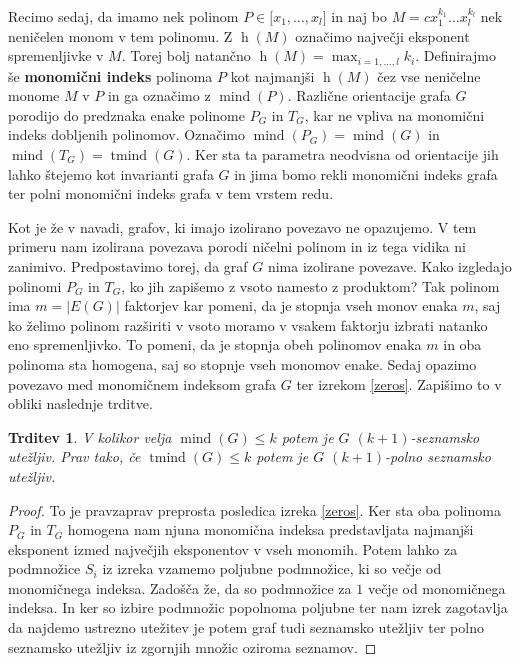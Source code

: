 \documentclass[12pt,a4paper,twoside]{article}
\theoremstyle{definition} %
\theoremstyle{plain} %
\newtheorem{trditev}[definicija]{Trditev}
\numberwithin{equation}{section}  %
\DeclareMathOperator{\mind}{mind}
\DeclareMathOperator{\tmind}{tmind}
\DeclareMathOperator{\h}{h}
\begin{document}
Recimo sedaj, da imamo nek polinom $ P \in \mathbb[x_1, \ldots, x_l]$ in naj bo $M = cx_1^{k_1} \ldots x_l^{k_l}$ nek neničelen monom v tem polinomu. Z $\h(M)$ označimo največji eksponent spremenljivke v $M$. Torej bolj natančno $\h(M) = \max_{i = 1, \ldots, l} k_i$. Definirajmo še \textbf{monomični indeks} polinoma $P$ kot najmanjši $\h(M)$ čez vse neničelne monome $M$ v $P$ in ga označimo z \textbf{$\mind(P)$}. Različne orientacije grafa $G$ porodijo do predznaka enake polinome $P_G$ in $T_G$, kar ne vpliva na monomični indeks dobljenih polinomov. Označimo $\mind(P_G) = \mind(G)$ in $\mind(T_G) = \tmind(G)$. Ker sta ta parametra neodvisna od orientacije jih lahko štejemo kot invarianti grafa $G$ in jima bomo rekli monomični indeks grafa ter polni monomični indeks grafa v tem vrstem redu. 

Kot je že v navadi, grafov, ki imajo izolirano povezavo ne opazujemo. V tem primeru nam izolirana povezava porodi ničelni polinom in iz tega vidika ni zanimivo. Predpostavimo torej, da graf $G$ nima izolirane povezave. Kako izgledajo polinomi $P_G$ in $T_G$, ko jih zapišemo z vsoto namesto z produktom? Tak polinom ima $m = |E(G)|$ faktorjev kar pomeni, da je stopnja vseh monov enaka $m$, saj ko želimo polinom razširiti v vsoto moramo v vsakem faktorju izbrati natanko eno spremenljivko. To pomeni, da je stopnja obeh polinomov enaka $m$ in oba polinoma sta homogena, saj so stopnje vseh monomov enake. Sedaj opazimo povezavo med monomičnem indeksom grafa $G$ ter izrekom \ref{zeros}. Zapišimo to v obliki naslednje trditve.
\begin{trditev}
V kolikor velja $\mind(G) \le k$ potem je $G$ $(k+1)$-seznamsko utežljiv. Prav tako, če $\tmind(G) \le k$ potem je $G$ $(k+1)$-polno seznamsko utežljiv.
\end{trditev}

\begin{proof}
To je pravzaprav preprosta posledica izreka \ref{zeros}. Ker sta oba polinoma $P_G$ in $T_G$ homogena nam njuna monomična indeksa predstavljata najmanjši eksponent izmed največjih eksponentov v vseh monomih. Potem lahko za podmnožice $S_i$ iz izreka vzamemo poljubne podmnožice, ki so večje od monomičnega indeksa. Zadošča že, da so podmnožice za $1$ večje od monomičnega indeksa. In ker so izbire podmnožic popolnoma poljubne ter nam izrek zagotavlja da najdemo ustrezno utežitev je potem graf tudi seznamsko utežljiv ter polno seznamsko utežljiv iz zgornjih množic oziroma seznamov.
\end{proof}
\end{document}
